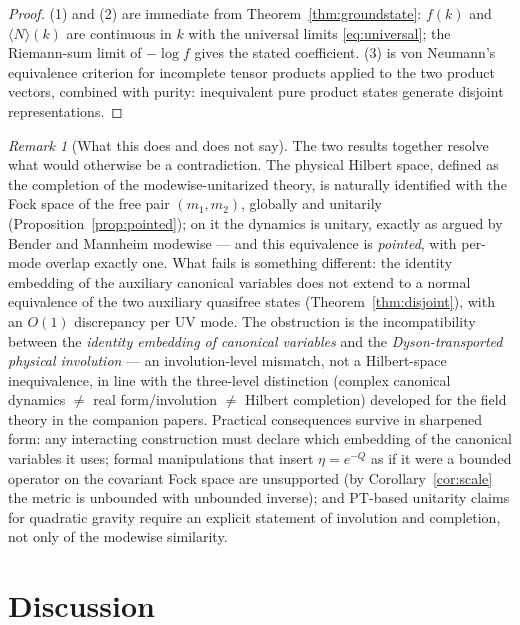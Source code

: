 \documentclass[11pt]{article}
\theoremstyle{definition}
\theoremstyle{remark}
\newtheorem{remark}[theorem]{Remark}
\begin{document}
\begin{proof}
(1) and (2) are immediate from Theorem~\ref{thm:groundstate}: $f(k)$ and
$\langle N\rangle(k)$ are continuous in $k$ with the universal limits
\eqref{eq:universal}; the Riemann-sum limit of $-\log f$ gives the stated
coefficient.  (3) is von Neumann's
equivalence criterion for incomplete tensor products \cite{vN1939} applied
to the two product vectors, combined with purity: inequivalent pure product
states generate disjoint representations.
\end{proof}

\begin{remark}[What this does and does not say]\label{rem:meaning}
The two results together resolve what would otherwise be a contradiction.
The physical Hilbert space, defined as the completion of the
modewise-unitarized theory, is naturally identified with the Fock space
of the free pair $(m_1,m_2)$, globally and unitarily
(Proposition~\ref{prop:pointed}); on it the dynamics is unitary, exactly
as argued by Bender and Mannheim modewise --- and this equivalence is
\emph{pointed}, with per-mode overlap exactly one.  What fails is
something different: the identity embedding of the auxiliary canonical
variables does not extend to a normal equivalence of the two auxiliary
quasifree states (Theorem~\ref{thm:disjoint}), with an $O(1)$ discrepancy
per UV mode.  The obstruction is the incompatibility between the
\emph{identity embedding of canonical variables} and the
\emph{Dyson-transported physical involution} --- an involution-level
mismatch, not a Hilbert-space inequivalence, in line with the three-level
distinction (complex canonical dynamics $\neq$ real form/involution
$\neq$ Hilbert completion) developed for the field theory in the
companion papers.  Practical consequences survive in sharpened form: any
interacting construction must declare which embedding of the canonical
variables it uses; formal manipulations that insert $\eta=e^{-Q}$ as if
it were a bounded operator on the covariant Fock space are unsupported
(by Corollary~\ref{cor:scale} the metric is unbounded with unbounded
inverse); and PT-based unitarity claims for quadratic gravity
\cite{QQG2024} require an explicit statement of involution and
completion, not only of the modewise similarity.
\end{remark}

\section{Discussion}\label{sec:discussion}
\end{document}
